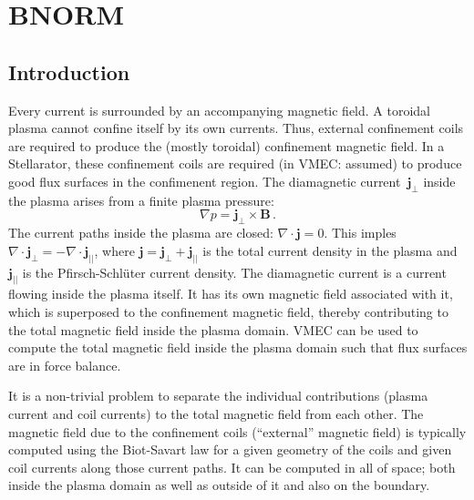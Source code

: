 \chapter{BNORM}

\FloatBarrier
\section{Introduction}
Every current is surrounded by an accompanying magnetic field.
A toroidal plasma cannot confine itself by its own currents.
Thus, external confinement coils are required to produce the (mostly toroidal) confinement magnetic field.
In a Stellarator, these confinement coils are required (in VMEC: assumed)
to produce good flux surfaces in the confimenent region.
The diamagnetic current~$\mathbf{j}_\perp$ inside the plasma arises from a finite plasma pressure:
\begin{equation}
 \nabla p = \mathbf{j}_\perp \times \mathbf{B} \, .
\end{equation}
The current paths inside the plasma are closed: $\nabla \cdot \mathbf{j} = 0$.
This imples $\nabla \cdot \mathbf{j}_\perp = -\nabla \cdot \mathbf{j}_{||}$,
where $\mathbf{j} = \mathbf{j}_\perp + \mathbf{j}_{||}$ is the total current density in the plasma
and $\mathbf{j}_{||}$ is the Pfirsch-Schlüter current density.
The diamagnetic current is a current flowing inside the plasma itself.
It has its own magnetic field associated with it,
which is superposed to the confinement magnetic field,
thereby contributing to the total magnetic field inside the plasma domain.
VMEC can be used to compute the total magnetic field inside the plasma domain
such that flux surfaces are in force balance.

It is a non-trivial problem to separate the individual contributions (plasma current and coil currents)
to the total magnetic field from each other.
The magnetic field due to the confinement coils (``external'' magnetic field)
is typically computed using the Biot-Savart law
for a given geometry of the coils and given coil currents along those current paths.
It can be computed in all of space; both inside the plasma domain
as well as outside of it and also on the boundary.


